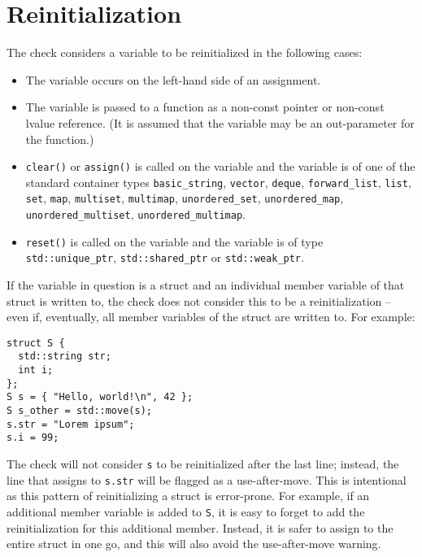 \section{Reinitialization}
The check considers a variable to be reinitialized in the following cases:
\begin{itemize}
    \item The variable occurs on the left-hand side of an assignment.
    \item The variable is passed to a function as a non-const pointer or non-const lvalue reference. (It is assumed that the variable may be an out-parameter for the function.)
    \item \texttt{clear()} or \texttt{assign()} is called on the variable and the variable is of one of the standard container types \texttt{basic_string}, \texttt{vector}, \texttt{deque}, \texttt{forward_list}, \texttt{list}, \texttt{set}, \texttt{map}, \texttt{multiset}, \texttt{multimap}, \texttt{unordered_set}, \texttt{unordered_map}, \texttt{unordered_multiset}, \texttt{unordered_multimap}.
    \item \texttt{reset()} is called on the variable and the variable is of type \texttt{std::unique_ptr}, \texttt{std::shared_ptr} or \texttt{std::weak_ptr}.
\end{itemize}

If the variable in question is a struct and an individual member variable of that struct is written to, the check does not consider this to be a reinitialization – even if, eventually, all member variables of the struct are written to. For example:
\begin{verbatim}
struct S {
  std::string str;
  int i;
};
S s = { "Hello, world!\n", 42 };
S s_other = std::move(s);
s.str = "Lorem ipsum";
s.i = 99;
\end{verbatim}

The check will not consider \texttt{s} to be reinitialized after the last line; instead, the line that assigns to \texttt{s.str} will be flagged as a use-after-move. This is intentional as this pattern of reinitializing a struct is error-prone. For example, if an additional member variable is added to \texttt{S}, it is easy to forget to add the reinitialization for this additional member. Instead, it is safer to assign to the entire struct in one go, and this will also avoid the use-after-move warning.









